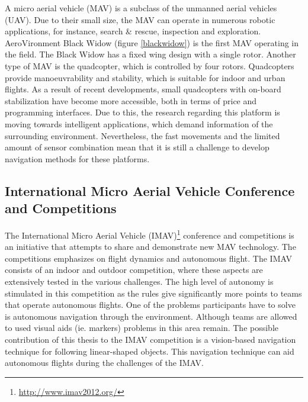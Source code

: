 \documentclass[a4paper]{article}
\begin{document}
A micro aerial vehicle (MAV) is a subclass of the unmanned aerial vehicles (UAV). Due to their small size, the MAV can operate in numerous robotic applications, for instance, search \&  rescue, inspection and exploration. AeroVironment Black Widow \cite{Grasmeyer2001} (figure \ref{blackwidow}) is the first MAV operating in the field. The Black Widow has a fixed wing design with a single rotor. Another type of MAV is the quadcopter, which is controlled by four rotors. Quadcopters provide manoeuvrability and stability, which is suitable for indoor and urban flights. As a result of recent developments, small quadcopters with on-board stabilization have become more accessible, both in terms of price and programming interfaces. Due to this, the research regarding this platform is moving towards intelligent applications, which demand information of the surrounding environment. Nevertheless, the fast movements and the limited amount of sensor combination mean that it is still a challenge to develop navigation methods for these platforms.

\subsection{International Micro Aerial Vehicle Conference and Competitions}
The International Micro Aerial Vehicle (IMAV)\footnote{\url{http://www.imav2012.org/}} conference and competitions is an initiative that attempts to share and demonstrate new MAV technology. The competitions emphasizes on flight dynamics and autonomous flight. The IMAV consists of an indoor and outdoor competition, where these aspects are extensively tested in the various challenges. The high level of autonomy is stimulated in this competition as the rules give significantly more points to teams that operate autonomous flights. One of the problems participants have to solve is autonomous navigation through the environment. Although teams are allowed to used visual aids (ie. markers) problems in this area remain. The possible contribution of this thesis to the IMAV competition is a vision-based navigation technique for following linear-shaped objects. This navigation technique can aid autonomous flights during the challenges of the IMAV.
\end{document}

